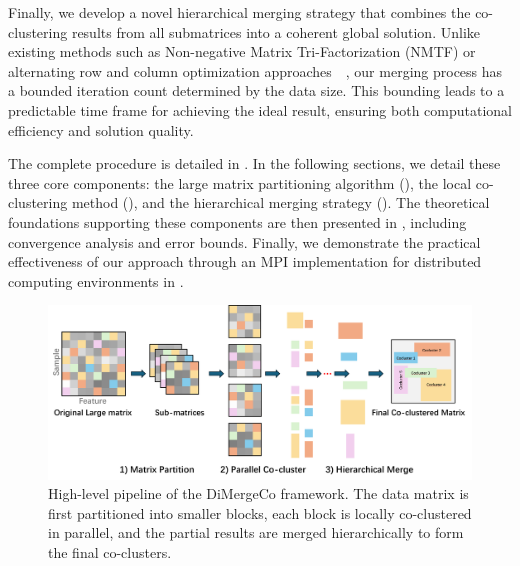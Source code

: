 \documentclass[journal]{IEEEtran}
\renewcommand{\cite}[1]{~\autocite{#1}}
\begin{document}
Finally, we develop a novel hierarchical merging strategy that combines the co-clustering results from all submatrices into a coherent global solution. Unlike existing methods such as Non-negative Matrix Tri-Factorization (NMTF) or alternating row and column optimization approaches~\cite{wang2011FastNonnegativeMatrix}, our merging process has a bounded iteration count determined by the data size. This bounding leads to a predictable time frame for achieving the ideal result, ensuring both computational efficiency and solution quality.

The complete procedure is detailed in . In the following sections, we detail these three core components: the large matrix partitioning algorithm (), the local co-clustering method (), and the hierarchical merging strategy (). The theoretical foundations supporting these components are then presented in , including convergence analysis and error bounds. Finally, we demonstrate the practical effectiveness of our approach through an MPI implementation for distributed computing environments in .

\begin{figure}[t]
    \centering
    \includegraphics[width=0.8\linewidth]{workflow.png} %
    \caption{High-level pipeline of the DiMergeCo framework. The data matrix is first partitioned into smaller blocks, each block is locally co-clustered in parallel, and the partial results are merged hierarchically to form the final co-clusters.}
    \label{fig:DiMergeCo_pipeline}
\end{figure}
\end{document}
